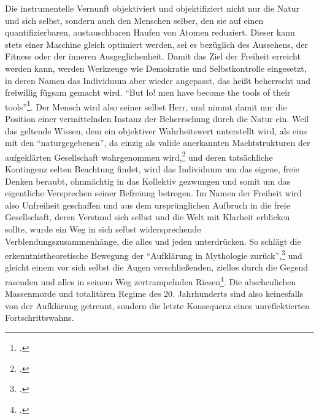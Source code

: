 \documentclass[a4paper, 12pt]{article}
\begin{document}
\begin{onehalfspace}
Die instrumentelle Vernunft objektiviert und objektifiziert nicht nur die Natur und sich selbst, sondern auch den Menschen selber, den sie auf einen quantifizierbaren, austauschbaren Haufen von Atomen reduziert. Dieser kann stets einer Maschine gleich optimiert werden, sei es bezüglich des Aussehens, der Fitness oder der inneren Ausgeglichenheit. Damit das Ziel der Freiheit erreicht werden kann, werden Werkzeuge wie Demokratie und Selbstkontrolle eingesetzt, in deren Namen das Individuum aber wieder angepasst, das heißt beherrscht und freiwillig fügsam gemacht wird. "`But lo! men have become the tools of their tools"'\footnote{\Cite[Siehe][S. 37]{walden}.}. Der Mensch wird also seiner selbst Herr, und nimmt damit nur die Position einer vermittelnden Instanz der Beherrschung durch die Natur ein. Weil das geltende Wissen, dem ein objektiver Wahrheitswert unterstellt wird, als eins mit den "`naturgegebenen"', da einzig als valide anerkannten Machtstrukturen der aufgeklärten Gesellschaft wahrgenommen wird,\footnote{\Cite[Vgl.][S. 411 XXX]{habermas}.} und deren tatsächliche Kontingenz selten Beachtung findet, wird das Individuum um das eigene, freie Denken beraubt, ohnmächtig in das Kollektiv gezwungen und somit um das eigentliche Versprechen seiner Befreiung betrogen. Im Namen der Freiheit wird also Unfreiheit geschaffen und aus dem ursprünglichen Aufbruch in die freie Gesellschaft, deren Verstand sich selbst und die Welt mit Klarheit erblicken sollte, wurde ein Weg in sich selbst widersprechende Verblendungszusammenhänge, die alles und jeden unterdrücken. So schlägt die erkenntnistheoretische Bewegung der "`Aufklärung in Mythologie zurück"',\footnote{\Cite[Siehe][S. 6]{dialektik-der-aufklaerung}.} und gleicht einem vor sich selbst die Augen verschließenden, ziellos durch die Gegend rasenden und alles in seinem Weg zertrampelnden Riesen\footnote{\Cite[Vgl.][S. 25]{fortschritt}.}. Die abscheulichen Massenmorde und totalitären Regime des 20. Jahrhunderts sind also keinesfalls von der Aufklärung getrennt, sondern die letzte Konsequenz eines unreflektierten Fortschrittswahns.


\end{onehalfspace}
\end{document}
